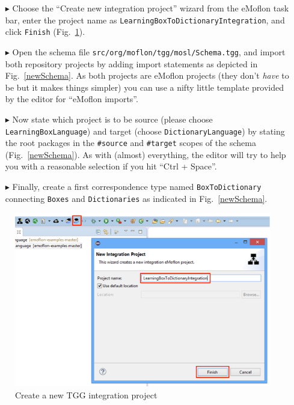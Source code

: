\begin{itemize}

\item[$\blacktriangleright$] Choose the ``Create new integration project'' wizard from the eMoflon task bar, enter the project name as
\texttt{Learning\-Box\-To\-Dictionary\-In\-te\-gra\-tion}, and click \texttt{Finish} (Fig.~\ref{intgPackage}).

\item[$\blacktriangleright$] Open the schema file \texttt{src/org/moflon/tgg/mosl/Schema.tgg}, and import both repository projects by adding import statements as depicted in Fig.~\ref{newSchema}.
As both projects are eMoflon projects (they don't \emph{have} to be but it makes things simpler) you can use a nifty little template provided by the editor for ``eMoflon imports''.

\item[$\blacktriangleright$] Now state which project is to be source (please choose \texttt{Learning\-Box\-Language}) and target (choose \texttt{Dictionary\-Language}) by stating the root packages in the \texttt{\#source} and \texttt{\#target} scopes of the schema (Fig.~\ref{newSchema}).
As with (almost) everything, the editor will try to help you with a reasonable selection if you hit ``Ctrl + Space''. 

\item[$\blacktriangleright$] Finally, create a first correspondence type named \texttt{BoxToDictionary} connecting \texttt{Boxes} and \texttt{Dictionaries} as indicated in Fig.~\ref{newSchema}.
\end{itemize}

\begin{figure}[htbp]
\begin{center}
  \includegraphics[width=\textwidth]{newIntegrationProject}
  \caption{Create a new TGG integration project}  
  \label{intgPackage}
\end{center}
\end{figure}

